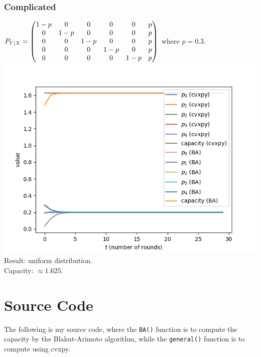 \subsubsection{Complicated}

$P_{Y|X}=\begin{pmatrix}
1-p&0&0&0&0&p\\
0&1-p&0&0&0&p\\
0&0&1-p&0&0&p\\
0&0&0&1-p&0&p\\
0&0&0&0&1-p&p
\end{pmatrix}$ where $p=0.3$.\\
\includegraphics[width=15cm]{erasure2.png}\\
Result: uniform distribution.\\
Capacity: $\approx 1.625$.

\section{Source Code}

The following is my source code, where the \texttt{BA()} function is to compute the capacity by the Blahut-Arimoto algorithm, while the \texttt{general()} function is to compute using cvxpy.



